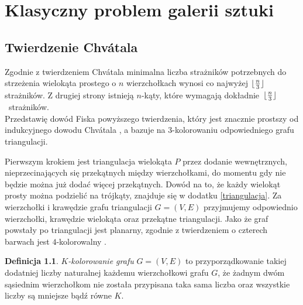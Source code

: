 \documentclass[brudnopis]{xmgr}
\DeclarePairedDelimiter\floor{\lfloor}{\rfloor}
\theoremstyle{definition}
\newtheorem{Definicja}{Definicja}
\begin{document}
\chapter{Klasyczny problem galerii sztuki}

\section{Twierdzenie Chv\'atala}\label{sec:klasyczny}
Zgodnie z twierdzeniem Chv\'atala \cite{chvatal} \label{tw chvatala} minimalna liczba strażników potrzebnych do strzeżenia wielokąta prostego o $n$ wierzchołkach wynosi co najwyżej $\floor{\frac{n}{3}}$ strażników.
Z drugiej strony istnieją $n$-kąty, które wymagają \mbox{dokładnie $\floor{\frac{n}{3}}$ strażników.}
\\\indent Przedstawię dowód Fiska \cite{fisk} powyższego twierdzenia, który jest znacznie prostszy od indukcyjnego dowodu Chv\'atala \cite{chvatal}, a bazuje na $3$-kolorowaniu odpowiedniego grafu triangulacji. 

Pierwszym krokiem jest triangulacja wielokąta $P$ przez dodanie wewnętrznych, nieprzecinających się przekątnych między wierzchołkami, do momentu gdy nie będzie można już dodać więcej przekątnych. 
Dowód na to, że każdy wielokąt prosty można podzielić na trójkąty, znajduje się w dodatku \ref{triangulacja}.
Za wierzchołki i krawędzie grafu triangulacji $G=(V,E)$ przyjmujemy odpowiednio wierzchołki, krawędzie wielokąta oraz przekątne triangulacji. Jako że graf powstały po triangulacji jest planarny, zgodnie z twierdzeniem o czterech barwach jest $4$-kolorowalny \cite{appel}.

\begin{Definicja} 
   \emph{$K$-kolorowanie grafu} $G = (V,E)$ to przyporządkowanie takiej dodatniej liczby naturalnej każdemu wierzchołkowi grafu $G$, że żadnym dwóm sąsiednim wierzchołkom nie została przypisana taka sama liczba oraz wszystkie liczby są mniejsze bądź równe $K$.
\end{Definicja}
\end{document}

